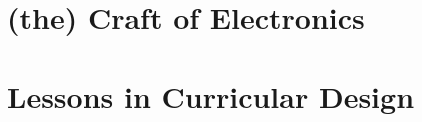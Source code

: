 


  
  \chapter{(the) Craft of Electronics}
  
  
  
  
  \chapter{Lessons in Curricular Design}
  
  
  
  
